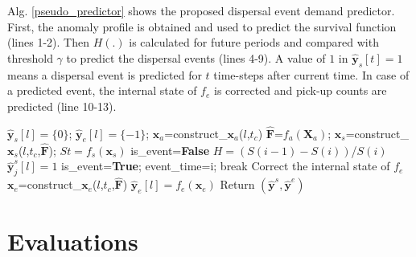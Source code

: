 \documentclass[letterpaper]{article} %
\begin{document}
Alg. \ref{pseudo_predictor} shows the proposed dispersal event demand predictor. First, the anomaly profile is obtained and used to predict the survival function (lines 1-2). Then $H(.)$ is calculated for future periods and compared with threshold $\gamma$ to predict the dispersal events (lines 4-9). A value of $1$ in $\hat{\textbf{y}}_s[t]=1$ means a dispersal event is predicted for $t$ time-steps after current time. In case of a predicted event, the internal state of $f_e$ is corrected and pick-up counts are predicted (line 10-13).
\begin{algorithm}
	\small
	\LinesNumbered
	\DontPrintSemicolon
	\BlankLine
	\caption{\small Dispersal event predictor (DILSA)}
	\label{pseudo_predictor}
	\BlankLine
	{
		$\hat{\textbf{y}}_s[l]=\{0\}$; $\hat{\textbf{y}}_e[l]=\{-1\}$; $\textbf{x}_a$=construct\_$\textbf{x}_a$($l$,$t_c$)\;
		$\hat{\textbf{F}}$=$f_a(\textbf{X}_a)$; $\textbf{x}_s$=construct\_$\textbf{x}_s$($l$,$t_c$,$\hat{\textbf{F}}$); $St=f_s(\textbf{x}_s)$\;
		is\_event=\textbf{False}\;
		\For{$i\in{[1,t_g-t_c)}$}
		{
			$H=(S(i-1)-S(i))$/$S(i)$\;
			{
				\For{$j\in{[i,t_g)}$}
				{
					$\hat{\textbf{y}}^s_j[l]=1$\;
				}
				is\_event=\textbf{True}; event\_time=i; break\;
			}
		}
		{
			Correct the internal state of $f_e$\;
			$\textbf{x}_e$=construct\_$\textbf{x}_e$($l$,$t_c$,$\hat{\textbf{F}}$)\;
			$\hat{\textbf{y}}_e[l]=f_e(\textbf{x}_e)$\;
		}
	}
	Return $(\hat{\textbf{y}}^s,\hat{\textbf{y}}^e)$\;
\end{algorithm}





\section{Evaluations}
\label{evaluation}
\end{document}
